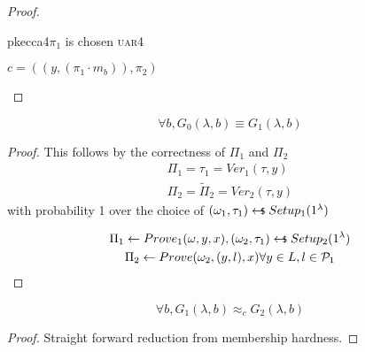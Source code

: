 \begin{proof}
\begin{cryptogame}{pkecca4}{$\pi_1$ is chosen \textsc{uar}}{4}
        \postlevel
    
        {$c = ((y, (\pi_1 \cdot m_b)), \pi_2)$}{}
    
        \postlevel
    
        \send{}{}{}
        \receive{}{}{}
    
        \postlevel
    
    
    \end{cryptogame}

\end{proof}


\begin{lemma}
    \[
        \forall b, G_{0}(\lambda, b) \equiv G_{1}(\lambda, b)   
    \]
\end{lemma}

\begin{proof}
    This follows by the correctness of $\Pi_{1}$ and $\Pi_{2}$
    \begin{gather*}
        \Pi_{1}=\tau_{1}=Ver_{1}(\tau, y)\\
         \Pi_{2}= \tilde{\Pi}_{2}=Ver_{2}(\tau, y)
    \end{gather*}
    with probability 1 over the choice of $(\omega_{1}, \tau_{1}) \pickUAR
    Setup_{1}(1^{\lambda})$
    
    \begin{gather*}
        \Pi_{1} \leftarrow Prove_{1}(\omega, y, x), (\omega_{2},
        \tau_{1})\pickUAR Setup_{2} (1^{\lambda})\\
        \Pi_{2} \leftarrow Prove(\omega_{2}, (y, l), x) \forall y \in L , l \in
        \P_{1}
    \end{gather*}
    
\end{proof}

\begin{lemma}
    \[
        \forall b, G_{1}(\lambda, b) \approx_{c} G_{2}(\lambda, b)   
    \]
\end{lemma}
\begin{proof}
    Straight forward reduction from membership hardness.
\end{proof}

